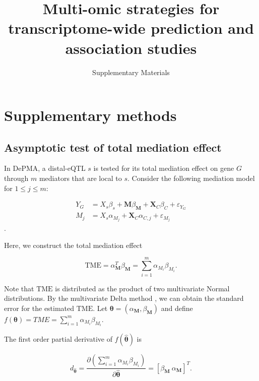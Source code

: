 \documentclass[11pt]{article}
\begin{document}
 
 
\title{Multi-omic strategies for transcriptome-wide prediction
    and association studies}
\author{Supplementary Materials} 
    \date{}
 
\maketitle

\section{Supplementary methods}

\subsection{Asymptotic test
of total mediation effect}


In DePMA, a distal-eQTL $s$
is tested for its total mediation effect on gene $G$
through $m$ mediators that are local to $s$.
Consider the following
mediation model for $1 \leq j \leq m$:

\begin{equation}\label{mediation}
\begin{split}
Y_G & = X_s\beta_s + \mathbf{M}\beta_{\mathbf{M}} + \mathbf{X}_C\beta_{C} + \varepsilon_{Y_G} \\
M_j & = X_s\alpha_{M_j} + \mathbf{X}_C\alpha_{C,j} + \varepsilon_{M_j}
\end{split}
\end{equation}.

Here, we construct the total mediation effect 

$$\text{TME} = 
\alpha_{\mathbf{M}}^T\beta_{\mathbf{M}} = 
\sum_{i=1}^{m}\alpha_{M_i}\beta_{M_i}.$$

Note that $\text{TME}$ is distributed
as the product of two multivariate Normal
distributions. By the multivariate
Delta method \cite{Bishop}, we can obtain the
standard error for the estimated
$\text{TME}$. Let 
$\boldsymbol{\theta} = (\alpha_\mathbf{M},\beta_\mathbf{M})$
and define $f(\boldsymbol{\theta}) = TME = 
\sum_{i=1}^{m}\alpha_{M_i}\beta_{M_i}$.

The first order partial derivative
of $f(\hat{\boldsymbol{\theta}})$
is

$$d_{\hat{\boldsymbol{\theta}}} = \frac{\partial(\sum_{i=1}^{m}\alpha_{M_i}\beta_{M_i})}{\partial{\hat{\boldsymbol{\theta}}}} = [\beta_{\mathbf{M}}~\alpha_{\mathbf{M}}]^T.$$
\end{document}
